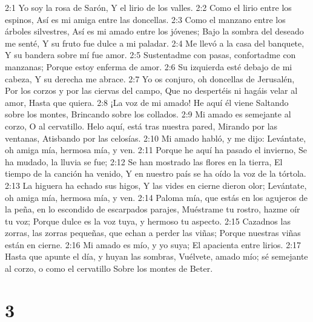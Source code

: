 2:1 Yo soy la rosa de Sarón,  
Y el lirio de los valles.  
2:2 Como el lirio entre los espinos,  
Así es mi amiga entre las doncellas.  
2:3 Como el manzano entre los árboles silvestres,  
Así es mi amado entre los jóvenes;  
Bajo la sombra del deseado me senté,  
Y su fruto fue dulce a mi paladar.  
2:4 Me llevó a la casa del banquete,  
Y su bandera sobre mí fue amor.  
2:5 Sustentadme con pasas, confortadme con manzanas;  
Porque estoy enferma de amor.  
2:6 Su izquierda esté debajo de mi cabeza,  
Y su derecha me abrace.  
2:7 Yo os conjuro, oh doncellas de Jerusalén,  
Por los corzos y por las ciervas del campo,  
Que no despertéis ni hagáis velar al amor,  
Hasta que quiera.  
2:8 ¡La voz de mi amado! He aquí él viene  
Saltando sobre los montes,  
Brincando sobre los collados.  
2:9 Mi amado es semejante al corzo,  
O al cervatillo.  
Helo aquí, está tras nuestra pared,  
Mirando por las ventanas,  
Atisbando por las celosías.  
2:10 Mi amado habló, y me dijo:  
Levántate, oh amiga mía, hermosa mía, y ven.  
2:11 Porque he aquí ha pasado el invierno,  
Se ha mudado, la lluvia se fue;  
2:12 Se han mostrado las flores en la tierra,  
El tiempo de la canción ha venido,  
Y en nuestro país se ha oído la voz de la tórtola.  
2:13 La higuera ha echado sus higos,  
Y las vides en cierne dieron olor;  
Levántate, oh amiga mía, hermosa mía, y ven.  
2:14 Paloma mía, que estás en los agujeros de la peña, en lo escondido de escarpados parajes,  
Muéstrame tu rostro, hazme oír tu voz;  
Porque dulce es la voz tuya, y hermoso tu aspecto.  
2:15 Cazadnos las zorras, las zorras pequeñas, que echan a perder las viñas;  
Porque nuestras viñas están en cierne.  
2:16 Mi amado es mío, y yo suya;  
El apacienta entre lirios.  
2:17 Hasta que apunte el día, y huyan las sombras,  
Vuélvete, amado mío; sé semejante al corzo, o como el cervatillo  
Sobre los montes de Beter. 

\chapter{3}

